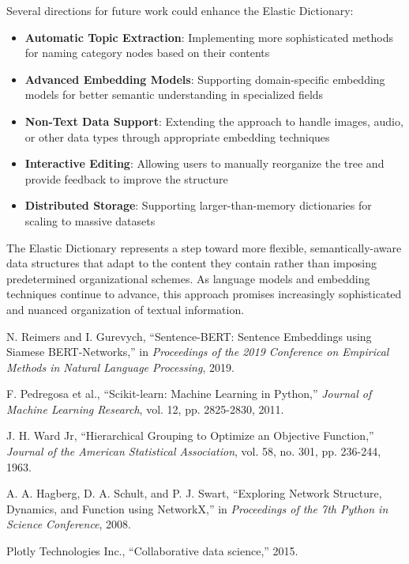 \documentclass[conference]{IEEEtran}
\begin{document}
Several directions for future work could enhance the Elastic Dictionary:

\begin{itemize}
    \item \textbf{Automatic Topic Extraction}: Implementing more sophisticated methods for naming category nodes based on their contents
    \item \textbf{Advanced Embedding Models}: Supporting domain-specific embedding models for better semantic understanding in specialized fields
    \item \textbf{Non-Text Data Support}: Extending the approach to handle images, audio, or other data types through appropriate embedding techniques
    \item \textbf{Interactive Editing}: Allowing users to manually reorganize the tree and provide feedback to improve the structure
    \item \textbf{Distributed Storage}: Supporting larger-than-memory dictionaries for scaling to massive datasets
\end{itemize}

The Elastic Dictionary represents a step toward more flexible, semantically-aware data structures that adapt to the content they contain rather than imposing predetermined organizational schemes. As language models and embedding techniques continue to advance, this approach promises increasingly sophisticated and nuanced organization of textual information.

\begin{thebibliography}{5}
 N. Reimers and I. Gurevych, ``Sentence-BERT: Sentence Embeddings using Siamese BERT-Networks,'' in \textit{Proceedings of the 2019 Conference on Empirical Methods in Natural Language Processing}, 2019.

 F. Pedregosa et al., ``Scikit-learn: Machine Learning in Python,'' \textit{Journal of Machine Learning Research}, vol. 12, pp. 2825-2830, 2011.

 J. H. Ward Jr, ``Hierarchical Grouping to Optimize an Objective Function,'' \textit{Journal of the American Statistical Association}, vol. 58, no. 301, pp. 236-244, 1963.

 A. A. Hagberg, D. A. Schult, and P. J. Swart, ``Exploring Network Structure, Dynamics, and Function using NetworkX,'' in \textit{Proceedings of the 7th Python in Science Conference}, 2008.

 Plotly Technologies Inc., ``Collaborative data science,'' 2015.
\end{thebibliography}
\end{document}
